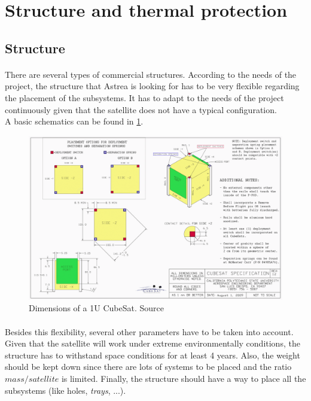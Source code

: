 \section{Structure and thermal protection}
\subsection{Structure}
\paragraph{}There are several types of commercial structures. According to the needs of the project, the structure that Astrea is looking for has to be very flexible regarding the placement of the subsystems. It has to adapt to the needs of the project continuously given that the satellite does not have a typical configuration.\\
A basic schematics can be found in \ref{epsschematics}.

\begin{figure}[h!]
\includegraphics[scale=0.6]{./sections/SatelliteDept/sections/images/CubeSatDesign}
\centering
\caption{Dimensions of a 1U CubeSat. Source \cite{CalPoly2014}}
\label{epsschematics}
\end{figure}

\paragraph{}Besides this flexibility, several other parameters have to be taken into account. Given that the satellite will work under extreme environmentally conditions, the structure has to withstand space conditions for at least 4 years. Also, the weight should be kept down since there are lots of systems to be placed and the ratio $ mass / satellite $ is limited. Finally, the structure should have a way to place all the subsystems (like holes, \textit{trays}, ...).

